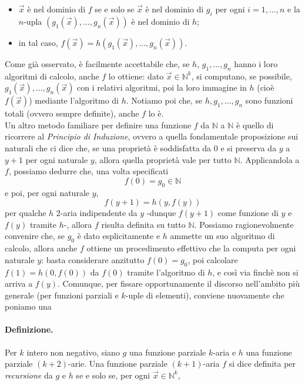 \begin{itemize}
    \item $\vec{x}$ è nel
          dominio di $f$ se e solo se $\vec{x}$ è nel dominio di $g_i$ per ogni $i=1,
              \ldots, n$ e la $n$-upla $\left(g_1(\vec{x}), \ldots, g_n(\vec{x})\right)$ è nel
          dominio di $h$;
    \item in tal caso, $f(\vec{x})=h\left(g_1(\vec{x}), \ldots,
              g_n(\vec{x})\right)$.
\end{itemize}

Come già osservato, è facilmente accettabile che, se $h$,
$g_1, \ldots, g_n$ hanno i loro algoritmi di calcolo, anche $f$ lo ottiene: dato
$\vec{x} \in \mathbb{N}^k$, si computano, se possibile, $g_1(\vec{x}), \ldots,
    g_n(\vec{x})$ con i relativi algoritmi, poi la loro immagine in $h$ (cioè
$f(\vec{x})$) mediante l'algoritmo di $h$. Notiamo poi che, se $h, g_1, \ldots,
    g_n$ sono funzioni totali (ovvero sempre definite), anche $f$ lo è.\\

Un altro metodo familiare per definire una funzione $f$ da $\mathbb{N}$ a
$\mathbb{N}$ è quello di ricorrere al \textit{Principio di Induzione}, ovvero a quella
fondamentale proposizione sui naturali che ci dice che, se una proprietà è
soddisfatta da 0 e si preserva da $y$ a $y+1$ per ogni naturale $y$, allora
quella proprietà vale per tutto $\mathbb{N}$. Applicandola a $f$, possiamo
dedurre che, una volta specificati
$$
    f(0)=g_0 \in \mathbb{N}
$$
e poi, per ogni naturale $y$,
$$
    f(y+1)=h(y, f(y))
$$
per qualche $h$ 2-aria indipendente da $y$ -dunque $f(y+1)$ come funzione di $y$
e $f(y)$ tramite $h$-, allora $f$ risulta definita su tutto $\mathbb{N}$.
Possiamo ragionevolmente convenire che, se $g_0$ è dato esplicitamente e $h$
ammette un suo algoritmo di calcolo, allora anche $f$ ottiene un procedimento
effettivo che la computa per ogni naturale $y$: basta considerare anzitutto
$f(0)=g_0$, poi calcolare $f(1)=h(0, f(0))$ da $f(0)$ tramite l'algoritmo di
$h$, e così via finchè non si arriva a $f(y)$. Comunque, per fissare
opportunamente il discorso nell'ambito più generale (per funzioni parziali e
$k$-uple di elementi), conviene nuovamente che poniamo una

\paragraph{Definizione.} Per $k$ intero non negativo, siano $g$ una funzione parziale
$k$-aria e $h$ una funzione parziale $(k+2)$-arie. Una funzione parziale
$(k+1)$-aria $f$ si dice definita per \textit{recursione} da $g$ e $h$ se e solo se, per
ogni $\vec{x} \in \mathbb{N}^k$,

